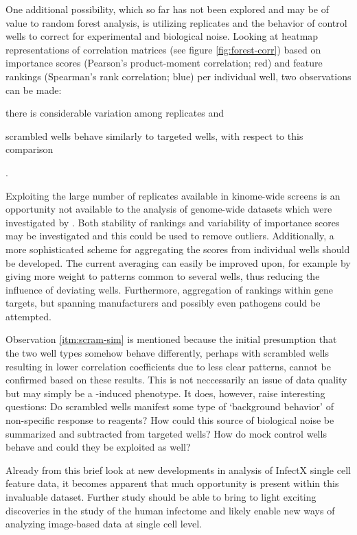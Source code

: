 

One additional possibility, which so far has not been explored and may be of value to random forest analysis, is utilizing replicates and the behavior of control wells to correct for experimental and biological noise. Looking at heatmap representations of correlation matrices (see figure \ref{fig:forest-corr}) based on importance scores (Pearson's product-moment correlation; red) and feature rankings (Spearman's rank correlation; blue) per individual well, two observations can be made: \begin{enumerate*}[label=\itshape (\arabic*)] \item there is considerable variation among replicates and \item \label{itm:scram-sim} scrambled wells behave similarly to targeted  wells, with respect to this comparison \end{enumerate*}.

Exploiting the large number of replicates available in kinome-wide screens is an opportunity not available to the analysis of genome-wide datasets which were investigated by \citeauthor{Drewek2015}. Both stability of rankings and variability of importance scores may be investigated and this could be used to remove outliers. Additionally, a more sophisticated scheme for aggregating the scores from individual wells should be developed. The current averaging can easily be improved upon, for example by giving more weight to patterns common to several wells, thus reducing the influence of deviating wells. Furthermore, aggregation of rankings within gene targets, but spanning manufacturers and possibly even pathogens could be attempted.

Observation \ref{itm:scram-sim} is mentioned because the initial presumption that the two well types somehow behave differently, perhaps with scrambled wells resulting in lower correlation coefficients due to less clear patterns, cannot be confirmed based on these results. This is not neccessarily an issue of data quality but may simply be a -induced phenotype. It does, however, raise interesting questions: Do scrambled wells manifest some type of `background behavior' of non-specific response to  reagents? How could this source of biological noise be summarized and subtracted from targeted  wells? How do mock control wells behave and could they be exploited as well?

Already from this brief look at new developments in analysis of InfectX single cell feature data, it becomes apparent that much opportunity is present within this invaluable dataset. Further study should be able to bring to light exciting discoveries in the study of the human infectome and likely enable new ways of analyzing image-based  data at single cell level.
